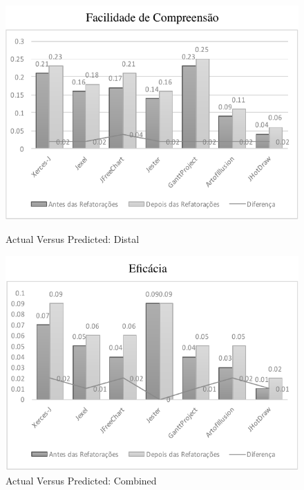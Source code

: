 \begin{figure}[h]
\vspace*{0.5cm} %
\begin{minipage}[t]{0.5\textwidth}
\includegraphics[width=\linewidth]{images/GraficoBarraExperimentoFacilidadeDeCompreensao}
\caption{Actual Versus Predicted: Distal}
\label{fig:distal}
\end{minipage}
\hspace{\fill}
\begin{minipage}[t]{0.5\textwidth}
\includegraphics[width=\linewidth]{images/GraficoBarraExperimentoEficacia}
\caption{Actual Versus Predicted: Combined}
\label{fig:combined}
\end{minipage}

\end{figure}








